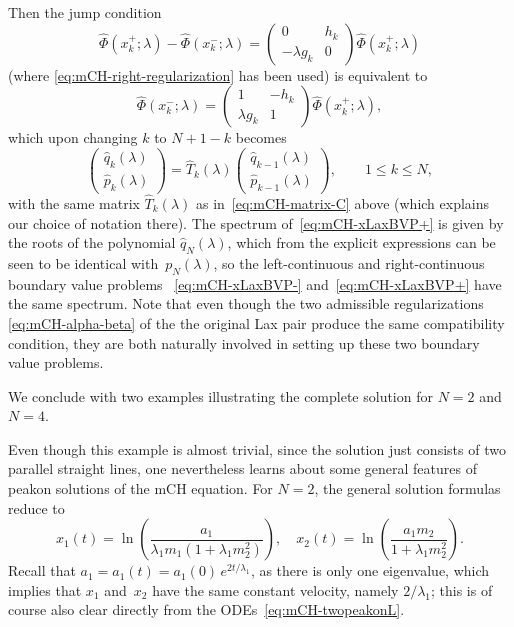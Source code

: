 \documentclass[10pt,a4paper]{article} \pdfoutput=1 
\begin{document}
Then the jump condition
\begin{equation}
  \widehat\Phi(x_k^+;\lambda) - \widehat\Phi(x_k^-;\lambda)
  = \begin{pmatrix} 0 & h_k \\ -\lambda g_k & 0 \end{pmatrix} \widehat\Phi(x_k^+;\lambda)
\end{equation}
(where \eqref{eq:mCH-right-regularization} has been used)
is equivalent to
\begin{equation*}
  \widehat\Phi(x_k^-;\lambda)
  = \begin{pmatrix} 1 & -h_k \\ \lambda g_k & 1 \end{pmatrix} \widehat\Phi(x_k^+;\lambda)
  ,
\end{equation*}
which upon changing $k$ to $N+1-k$ becomes
\begin{equation}
  \label{eq:mCH-transition-backwards}
  \begin{pmatrix} \widehat q_k(\lambda) \\ \widehat p_k(\lambda) \end{pmatrix}
  = \widehat T_k(\lambda) \begin{pmatrix} \widehat q_{k-1}(\lambda) \\ \widehat p_{k-1}(\lambda) \end{pmatrix}
  ,\qquad
  1 \le k \le N
  ,
\end{equation}
with the same matrix $\widehat T_k(\lambda)$ as in~\eqref{eq:mCH-matrix-C} above
(which explains our choice of notation there).
The spectrum of~\eqref{eq:mCH-xLaxBVP+}
is given by the roots of the polynomial $\widehat q_N(\lambda)$,
which from the explicit expressions can be seen to be identical
with~$p_N(\lambda)$,
so the left-continuous and right-continuous boundary value problems
~\eqref{eq:mCH-xLaxBVP-} and~\eqref{eq:mCH-xLaxBVP+}
have the same spectrum.
Note that even though the two admissible regularizations \eqref{eq:mCH-alpha-beta}
of the the original Lax pair
produce the same compatibility condition, they are both naturally involved
in setting up these two boundary value problems.


We conclude with two examples illustrating the complete solution for $N=2$ and $N=4$.

\begin{example}
  Even though this example is almost trivial, since the solution just consists of two parallel straight lines,
  one nevertheless learns about some general features of peakon solutions of the mCH equation.
  For $N=2$, the general solution formulas reduce to
  \begin{equation*}
    x_1(t) = \ln\left( \frac{a_1}{\lambda_1 m_1 (1 + \lambda_1 m_2^2)} \right)
    ,\quad
    x_2(t) = \ln\left( \frac{a_1 m_2}{1 + \lambda_1 m_2^2} \right)
    .
  \end{equation*}
  Recall that $a_1 = a_1(t) = a_1(0) \, e^{2t/\lambda_1}$,
  as there is only one eigenvalue, which implies that $x_1$ and~$x_2$
  have the same constant velocity, namely $2/\lambda_1$;
  this is of course also clear directly from the ODEs~\eqref{eq:mCH-twopeakonL}.
\end{example}
\end{document}
